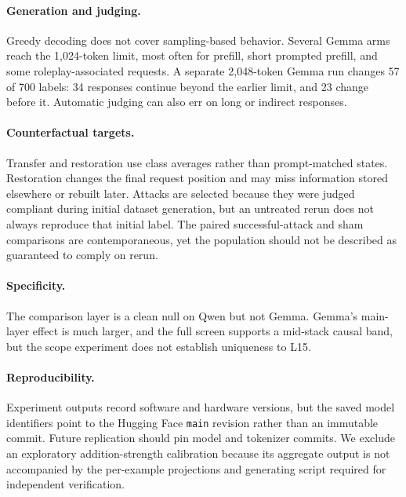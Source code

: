 \documentclass{article}
\begin{document}
\paragraph{Generation and judging.}
Greedy decoding does not cover sampling-based behavior. Several Gemma arms reach the 1,024-token limit, most often for prefill, short prompted prefill, and some roleplay-associated requests. A separate 2,048-token Gemma run changes 57 of 700 labels: 34 responses continue beyond the earlier limit, and 23 change before it. Automatic judging can also err on long or indirect responses.

\paragraph{Counterfactual targets.}
Transfer and restoration use class averages rather than prompt-matched states. Restoration changes the final request position and may miss information stored elsewhere or rebuilt later. Attacks are selected because they were judged compliant during initial dataset generation, but an untreated rerun does not always reproduce that initial label. The paired successful-attack and sham comparisons are contemporaneous, yet the population should not be described as guaranteed to comply on rerun.

\paragraph{Specificity.}
The comparison layer is a clean null on Qwen but not Gemma. Gemma's main-layer effect is much larger, and the full screen supports a mid-stack causal band, but the scope experiment does not establish uniqueness to L15.

\paragraph{Reproducibility.}
Experiment outputs record software and hardware versions, but the saved model identifiers point to the Hugging Face \texttt{main} revision rather than an immutable commit. Future replication should pin model and tokenizer commits. We exclude an exploratory addition-strength calibration because its aggregate output is not accompanied by the per-example projections and generating script required for independent verification.
\end{document}
